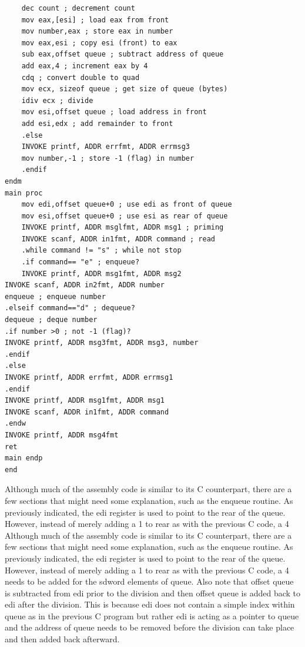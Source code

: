 \documentclass[10pt]{book}
\begin{document}
\begin{verbatim}
    dec count ; decrement count
    mov eax,[esi] ; load eax from front
    mov number,eax ; store eax in number
    mov eax,esi ; copy esi (front) to eax
    sub eax,offset queue ; subtract address of queue
    add eax,4 ; increment eax by 4
    cdq ; convert double to quad
    mov ecx, sizeof queue ; get size of queue (bytes)
    idiv ecx ; divide
    mov esi,offset queue ; load address in front
    add esi,edx ; add remainder to front
    .else
    INVOKE printf, ADDR errfmt, ADDR errmsg3
    mov number,-1 ; store -1 (flag) in number
    .endif
endm
main proc
    mov edi,offset queue+0 ; use edi as front of queue
    mov esi,offset queue+0 ; use esi as rear of queue
    INVOKE printf, ADDR msglfmt, ADDR msg1 ; priming
    INVOKE scanf, ADDR in1fmt, ADDR command ; read
    .while command != "s" ; while not stop
    .if command== "e" ; enqueue?
    INVOKE printf, ADDR msg1fmt, ADDR msg2
INVOKE scanf, ADDR in2fmt, ADDR number
enqueue ; enqueue number
.elseif command=="d" ; dequeue?
dequeue ; deque number
.if number >0 ; not -1 (flag)?
INVOKE printf, ADDR msg3fmt, ADDR msg3, number
.endif
.else
INVOKE printf, ADDR errfmt, ADDR errmsg1
.endif
INVOKE printf, ADDR msg1fmt, ADDR msg1
INVOKE scanf, ADDR in1fmt, ADDR command
.endw
INVOKE printf, ADDR msg4fmt
ret
main endp
end
\end{verbatim}

Although much of the assembly code is similar to its C counterpart, there are a few sections that might need some explanation, such as the enqueue routine. As previously indicated, the edi register is used to point to the rear of the queue. However, instead of merely adding a 1 to rear as with the previous C code, a 4\\
Although much of the assembly code is similar to its C counterpart, there are a few sections that might need some explanation, such as the enqueue routine. As previously indicated, the edi register is used to point to the rear of the queue. However, instead of merely adding a 1 to rear as with the previous C code, a 4 needs to be added for the sdword elements of queue. Also note that offset queue is subtracted from edi prior to the division and then offset queue is added back to edi after the division. This is because edi does not contain a simple index within queue as in the previous C program but rather edi is acting as a pointer to queue and the address of queue needs to be removed before the division can take place and then added back afterward.
\end{document}
